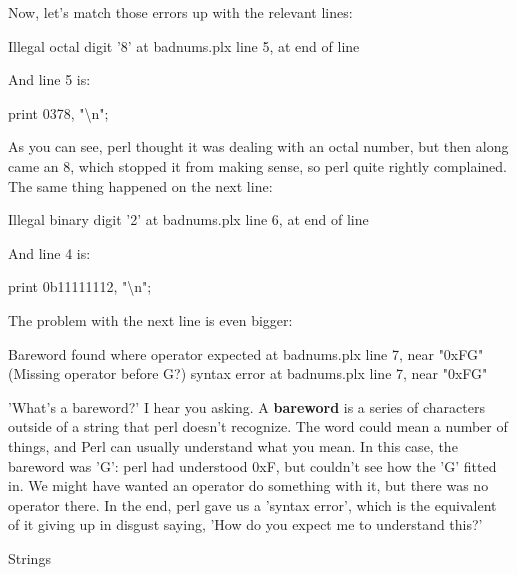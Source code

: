 \documentclass[a4paper,11pt]{book}
\begin{document}
\noindent 

\noindent 

\noindent Now, let's match those errors up with the relevant lines:

\noindent 

\noindent Illegal octal digit '8' at badnums.plx line 5, at end of line

\noindent 

\noindent And line 5 is:

\noindent 

\noindent 

\noindent print 0378, "\textbackslash n";

\noindent 

\noindent As you can see, perl thought it was dealing with an octal number, but then along came an 8, which stopped it from making sense, so perl quite rightly complained. The same thing happened on the next line:

\noindent 

\noindent Illegal binary digit '2' at badnums.plx line 6, at end of line

\noindent 

\noindent And line 4 is:

\noindent 

\noindent print 0b11111112, "\textbackslash n";

\noindent 

\noindent The problem with the next line is even bigger:

\noindent 

\noindent Bareword found where operator expected at badnums.plx line 7, near "0xFG" (Missing operator before G?) syntax error at badnums.plx line 7, near "0xFG"

\noindent 

\noindent 'What's a bareword?' I hear you asking. A \textbf{bareword }is a series of characters outside of a string that perl doesn't recognize. The word could mean a number of things, and Perl can usually understand what you mean. In this case, the bareword was 'G': perl had understood 0xF, but couldn't see how the 'G' fitted in. We might have wanted an operator do something with it, but there was no operator there. In the end, perl gave us a 'syntax error', which is the equivalent of it giving up in disgust saying, 'How do you expect me to understand this?'

\noindent 

\noindent Strings

\noindent 
\end{document}
